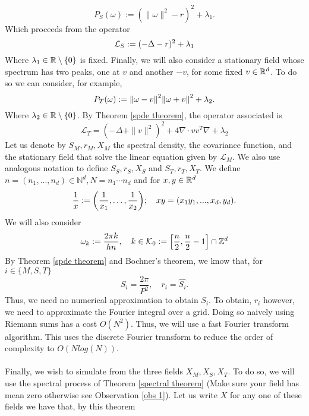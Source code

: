 \documentclass[12pt]{article}
\newcommand{\red}[1]{{\color{red}#1}}
\begin{document}
\begin{equation*}
	P_S(\omega):=(\|\omega\|^2-r)^2+\lambda_1.
\end{equation*}
Which proceeds from the operator
\begin{equation}
	\mathcal{L}_S:=(-\Delta-r)^2+\lambda_1
\end{equation}
Where $\lambda_1\in{\mathbb R}\setminus\{0\}$ is fixed. Finally, we will also consider a stationary field whose spectrum has two peaks, one  at $v$ and another $-v$,  for some fixed $v\in{\mathbb R}^d$. To do so we can consider, for example,
\begin{equation*}
	P_T(\omega):=\norm{\omega-v}^2\norm{\omega+v}^2+\lambda_2.
\end{equation*}
Where $\lambda_2\in{\mathbb R}\setminus\{0\}$.
By Theorem \ref{spde theorem}, the operator associated is
\begin{equation}\label{two peaks}
	\mathcal{L}_T=(-\Delta+\|v\|^2)^2+4\nabla\cdot vv^T\nabla+\lambda_2
\end{equation}
Let us denote by $S_M,r_M,X_M$ the spectral density, the covariance function, and the stationary field that solve the linear equation given by $\mathcal{L}_M$. We also use analogous notation to define $S_S,r_S,X_S$ and $S_T,r_T,X_T$. We define $n=(n_1,...,n_d)\in\mathbb{N}^d, N=n_1\cdots n_d$ and for $x,y\in{\mathbb R}^d$
\begin{equation*}
	\frac{1}{x}:=\qty(\frac{1}{x_1},\ldots,\frac{1}{x_2});\quad xy=(x_1y_1,...,x_d,y_d).
\end{equation*}
We will also consider
\begin{equation}\label{omk}
	\omega_k:=\frac{2\pi k}{hn},\quad k\in \mathcal{K}_0:=\qty[\frac{n}{2},\frac{n}{2}-1]\cap {\mathbb Z}^d
\end{equation}
By Theorem \ref{spde theorem} and Bochner's theorem, we know that, for $i\in \{M,S,T\}$
\begin{equation*}
	S_i=\frac{2\pi}{P^2},\quad r_i=\hat{S_i}.
\end{equation*}
Thus, we need no numerical approximation to obtain $S_i$. To obtain, $r_i$ however, we need to approximate the Fourier integral over a grid. Doing so naively using Riemann sums has a cost $O(N^2)$. Thus, we will use a fast Fourier transform algorithm. This uses the discrete Fourier transform to reduce the order of complexity to $O(Nlog(N))$.\\
\\
Finally, we wish to simulate from the three fields $X_M,X_S,X_T$. To do so, we will use the spectral process of Theorem \ref{spectral theorem} (\red{Make sure your field has mean zero otherwise see Observation \ref{obs 1}}). Let us write $X$ for any one of these fields we have that, by this theorem
\end{document}

